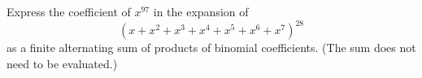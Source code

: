 Express the coefficient of $x^{97}$ in the expansion of
\[\left(x+x^2+x^3+x^4+x^5+x^6+x^7\right)^{28}\]
as a finite alternating sum of products of binomial coefficients. (The sum does not need to be evaluated.)
